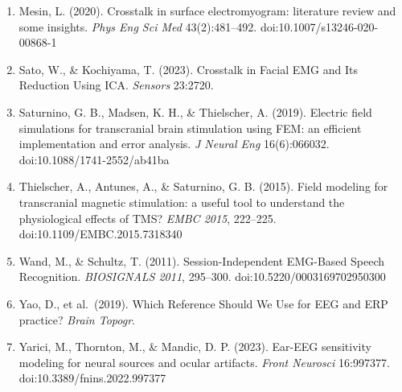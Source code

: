 \documentclass[
  11pt,
  a4paper,
]{article}
\begin{document}
\begin{enumerate}
  Meiser, A., Knoll, J., \& Bleichner, M. G. (2024). High-density ear-EEG for understanding ear-centered EEG. \emph{J Neural Eng} 21(1):016001. doi:10.1088/1741-2552/ad1783
\item
  Mesin, L. (2020). Crosstalk in surface electromyogram: literature review and some insights. \emph{Phys Eng Sci Med} 43(2):481--492. doi:10.1007/s13246-020-00868-1
\item
  Sato, W., \& Kochiyama, T. (2023). Crosstalk in Facial EMG and Its Reduction Using ICA. \emph{Sensors} 23:2720.
\item
  Saturnino, G. B., Madsen, K. H., \& Thielscher, A. (2019). Electric field simulations for transcranial brain stimulation using FEM: an efficient implementation and error analysis. \emph{J Neural Eng} 16(6):066032. doi:10.1088/1741-2552/ab41ba
\item
  Thielscher, A., Antunes, A., \& Saturnino, G. B. (2015). Field modeling for transcranial magnetic stimulation: a useful tool to understand the physiological effects of TMS? \emph{EMBC 2015}, 222--225. doi:10.1109/EMBC.2015.7318340
\item
  Wand, M., \& Schultz, T. (2011). Session-Independent EMG-Based Speech Recognition. \emph{BIOSIGNALS 2011}, 295--300. doi:10.5220/0003169702950300
\item
  Yao, D., et al.~(2019). Which Reference Should We Use for EEG and ERP practice? \emph{Brain Topogr}.
\item
  Yarici, M., Thornton, M., \& Mandic, D. P. (2023). Ear-EEG sensitivity modeling for neural sources and ocular artifacts. \emph{Front Neurosci} 16:997377. doi:10.3389/fnins.2022.997377
\end{enumerate}
\end{document}
